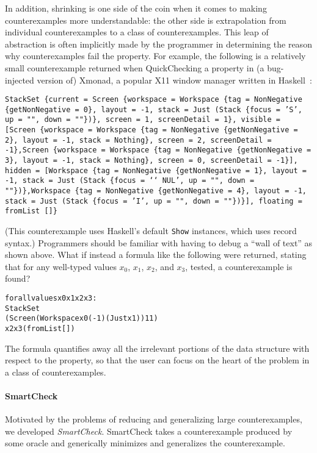 \documentclass{sigplanconf}
\newenvironment{code}{\begin{alltt}}{\end{alltt}}
\newcommand{\ttp}[1]{\texttt{#1}}
\begin{document}
In addition, shrinking is one side of the coin when it comes to making
counterexamples more understandable: the other side is extrapolation from
individual counterexamples to a class of counterexamples.  This leap of
abstraction is often implicitly made by the programmer in determining the reason
why counterexamples fail the property.  For example, the following is a
relatively small counterexample returned when QuickChecking a property in (a
bug-injected version of) Xmonad, a popular X11 window manager written in
Haskell~\cite{xmonad}:
%
\medskip%
\begin{sloppypar}
\noindent%
\ttp{StackSet \{current = Screen \{workspace = Workspace \{tag = NonNegative
      \{getNonNegative = 0\}, layout = -1, stack = Just (Stack \{focus = 'S', up =
        "", down = ""\})\}, screen = 1, screenDetail = 1\}, visible = [Screen
    \{workspace = Workspace \{tag = NonNegative \{getNonNegative = 2\}, layout = -1,
        stack = Nothing\}, screen = 2, screenDetail = -1\},Screen \{workspace =
      Workspace \{tag = NonNegative \{getNonNegative = 3\}, layout = -1, stack =
        Nothing\}, screen = 0, screenDetail = -1\}], hidden = [Workspace \{tag =
      NonNegative \{getNonNegative = 1\}, layout = -1, stack = Just (Stack \{focus
        = `\char`\\NUL', up = "", down = ""\})\},Workspace \{tag = NonNegative
      \{getNonNegative = 4\}, layout = -1, stack = Just (Stack \{focus = 'I', up =
        "", down = ""\})\}], floating = fromList []\} }
\end{sloppypar}
\medskip%
\noindent
(This counterexample uses Haskell's default \ttp{Show} instances, which uses
record syntax.)  Programmers should be familiar with having to debug
a ``wall of text'' as shown above.  What if instead a
formula like the following were returned, stating that for any well-typed
values $x_0$, $x_1$, $x_2$, and $x_3$, tested, a counterexample is found?

%
\begin{samepage}
\begin{code}
forall values x0 x1 x2 x3:
  StackSet
    (Screen (Workspace x0 (-1) (Just x1)) 1 1)
    x2 x3 (fromList [])
\end{code}
\end{samepage}
%
\noindent
The formula quantifies away all the irrelevant portions of the data structure
with respect to the property, so that the user can focus on the heart of the
problem in a class of counterexamples.

\paragraph{SmartCheck}
Motivated by the problems of reducing and generalizing large counterexamples, we
developed \emph{SmartCheck}.  SmartCheck takes a counterexample produced by some
oracle and generically minimizes and generalizes the counterexample.
\end{document}

